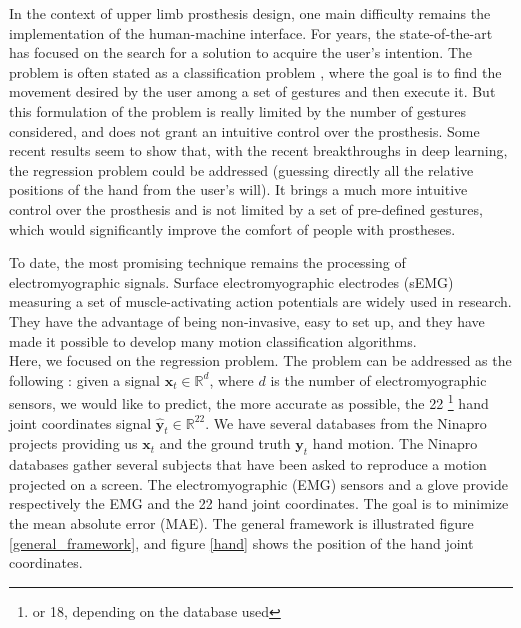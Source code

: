 \documentclass[final]{cvpr}
\begin{document}
In the context of upper limb prosthesis design, one main difficulty remains the implementation of the human-machine interface. For years, the state-of-the-art has focused on the search for a solution to acquire the user's intention. The problem is often stated as a classification problem \cite{classification}, where the goal is to find the movement desired by the user among a set of gestures and then execute it. But this formulation of the problem is really limited by the number of gestures considered, and does not grant an intuitive control over the prosthesis. Some recent results seem to show that, with the recent breakthroughs in deep learning, the regression problem could be addressed \cite{Koch} (guessing directly all the relative positions of the hand from the user’s will). It brings a much more intuitive control over the prosthesis and is not limited by a set of pre-defined gestures, which would significantly improve the comfort of people with prostheses.

To date, the most promising technique remains the processing of electromyographic signals. Surface electromyographic electrodes (sEMG) measuring a set of muscle-activating action potentials are widely used in research. They have the advantage of being non-invasive, easy to set up, and they have made it possible to develop many motion classification algorithms.\\

Here, we focused on the regression problem. The problem can be addressed as the following : given a signal $\pmb{x}_t \in \mathbb{R}^d$, where $d$ is the number of electromyographic sensors, we would like to predict, the more accurate as possible, the 22 \footnote{or 18, depending on the database used} hand joint coordinates signal $\hat{\pmb{y}}_t \in \mathbb{R}^{22}$. We have several databases from the Ninapro projects \cite{database} providing us $\pmb{x}_t$ and the ground truth ${\pmb{y}}_t$ hand motion. The Ninapro databases gather several subjects that have been asked to reproduce a motion projected on a screen. The electromyographic (EMG) sensors and a glove provide respectively the EMG and the 22  hand joint coordinates. The goal is to minimize the mean absolute error (MAE). The general framework is illustrated figure \ref{general_framework}, and figure \ref{hand} shows the position of the hand joint coordinates.


\end{document}
